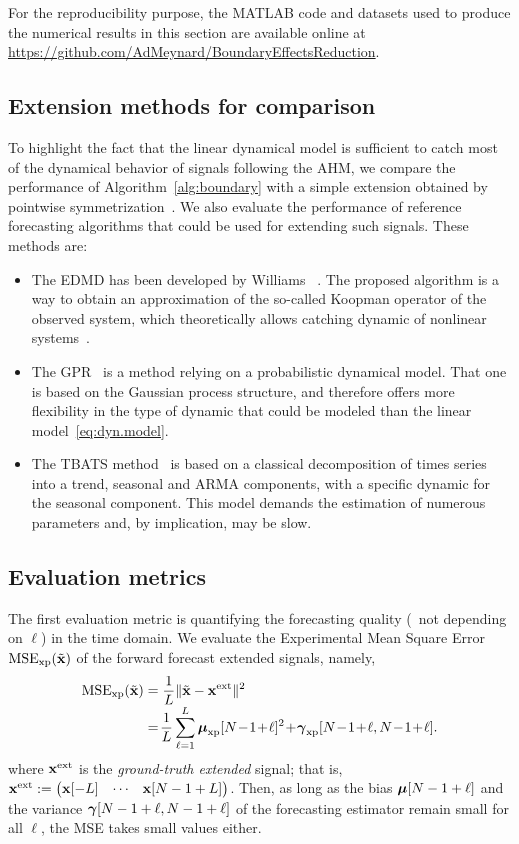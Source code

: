 For the reproducibility purpose, the MATLAB code and datasets used to produce the numerical results in this section are available online at \url{https://github.com/AdMeynard/BoundaryEffectsReduction}.


\subsection{Extension methods for comparison}
To highlight the fact that the linear dynamical model is sufficient to catch most of the dynamical behavior of signals following the AHM, we compare the performance of Algorithm~\ref{alg:boundary} with a simple extension obtained by pointwise symmetrization~\cite{Kharitonenko02wavelet}. We also evaluate the performance of reference forecasting algorithms that could be used for extending such signals. These methods are:
\begin{itemize}
\item The EDMD has been developed by Williams \etal~\cite{Williams15data}. The proposed algorithm is a way to obtain an approximation of the so-called Koopman operator of the observed system, which theoretically allows catching dynamic of nonlinear systems~\cite{Korda18linear}.
\item The GPR~\cite{Rasmussen06gaussian} is a method relying on a probabilistic dynamical model. That one is based on the Gaussian process structure, and therefore offers more flexibility in the type of dynamic that could be modeled than the linear model~\eqref{eq:dyn.model}.
\item The TBATS method~\cite{DeLivera11forecasting} is based on a classical decomposition of times series into a trend, seasonal and ARMA components, with a specific dynamic for the seasonal component. This model demands the estimation of numerous parameters and, by implication, may be slow. 
\end{itemize}


\subsection{Evaluation metrics}

The first evaluation metric is quantifying the forecasting quality (\ie~not depending on $\ell$) in the time domain. We evaluate the Experimental Mean Square Error $\mathrm{MSE_{xp}}(\tilde{{\mathbf x}})$ of the forward forecast extended signals, namely,
\begin{align}
\label{eq:mse}
\mathrm{MSE_{\xp}}(\tilde\bx) &= \dfrac1{L}\|\tilde\bx -\bx^\mathrm{ext}\|^2 \\[-1mm]
\nonumber
&=\! \dfrac1{L}\sum_{\ell=1}^L \bmu_{\xp}[N\!-\!1\!+\!\ell]^2 \!+\! \bgamma_{\xp}[N\!-\!1\!+\!\ell,N\!-\!1\!+\!\ell] .
\end{align}
where ${\mathbf x}^\mathrm{ext}$ is the {\em ground-truth extended} signal; that is, ${\mathbf x}^\mathrm{ext} := \begin{pmatrix}{\mathbf x}[-L] & \cdots & {\mathbf x}[N-1+L] \end{pmatrix}$. Then, as long as the bias $\boldsymbol{\mu}[N-1+\ell]$ and the variance $\boldsymbol{\gamma}[N-1+\ell,N-1+\ell]$ of the forecasting estimator remain small for all $\ell$, the MSE takes small values either.




